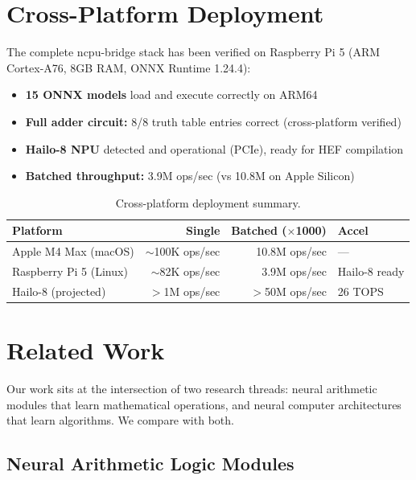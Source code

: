 \documentclass[11pt,a4paper]{article}
\begin{document}
\section{Cross-Platform Deployment}

The complete ncpu-bridge stack has been verified on Raspberry Pi 5 (ARM Cortex-A76, 8GB RAM, ONNX Runtime 1.24.4):

\begin{itemize}[itemsep=2pt]
    \item \textbf{15 ONNX models} load and execute correctly on ARM64
    \item \textbf{Full adder circuit:} 8/8 truth table entries correct (cross-platform verified)
    \item \textbf{Hailo-8 NPU} detected and operational (PCIe), ready for HEF compilation
    \item \textbf{Batched throughput:} 3.9M ops/sec (vs 10.8M on Apple Silicon)
\end{itemize}

\begin{table}[h]
\centering
\begin{tabular}{lrrl}
\toprule
\textbf{Platform} & \textbf{Single} & \textbf{Batched ($\times$1000)} & \textbf{Accel} \\
\midrule
Apple M4 Max (macOS) & ${\sim}$100K ops/sec & 10.8M ops/sec & --- \\
Raspberry Pi 5 (Linux) & ${\sim}$82K ops/sec & 3.9M ops/sec & Hailo-8 ready \\
Hailo-8 (projected) & $>$1M ops/sec & $>$50M ops/sec & 26 TOPS \\
\bottomrule
\end{tabular}
\caption{Cross-platform deployment summary.}
\end{table}

\section{Related Work}
\label{sec:related}

Our work sits at the intersection of two research threads: neural arithmetic modules that learn mathematical operations, and neural computer architectures that learn algorithms. We compare with both.

\subsection{Neural Arithmetic Logic Modules}
\end{document}
